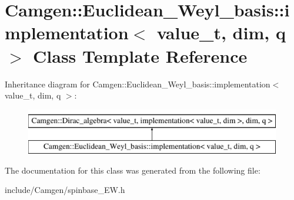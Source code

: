 \hypertarget{a00289}{}\section{Camgen\+:\+:Euclidean\+\_\+\+Weyl\+\_\+basis\+:\+:implementation$<$ value\+\_\+t, dim, q $>$ Class Template Reference}
\label{a00289}
Inheritance diagram for Camgen\+:\+:Euclidean\+\_\+\+Weyl\+\_\+basis\+:\+:implementation$<$ value\+\_\+t, dim, q $>$\+:\begin{figure}[H]
\begin{center}
\leavevmode
\includegraphics[height=2.000000cm]{a00289}
\end{center}
\end{figure}


The documentation for this class was generated from the following file\+:\begin{DoxyCompactItemize}
\item 
include/\+Camgen/spinbase\+\_\+\+E\+W.\+h\end{DoxyCompactItemize}
